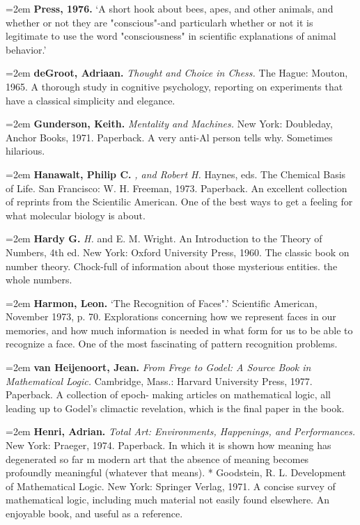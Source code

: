 \par\noindent\hangindent=2em {\bf Press, 1976.} `A short hook about bees, apes, and other animals, and whether or not they are "conscious"-and particularh whether or not it is legitimate to use the word "consciousness" in scientific explanations of animal behavior.' 

\par\noindent\hangindent=2em {\bf deGroot, Adriaan.} {\it Thought and Choice in Chess.} The Hague: Mouton, 1965. A thorough study in cognitive psychology, reporting on experiments that have a classical simplicity and elegance.

\par\noindent\hangindent=2em {\bf Gunderson, Keith.} {\it Mentality and Machines.} New York: Doubleday, Anchor Books, 1971. Paperback. A very anti-Al person tells why. Sometimes hilarious.

\par\noindent\hangindent=2em {\bf Hanawalt, Philip C.} {\it , and Robert H.} Haynes, eds. The Chemical Basis of Life. San Francisco: W. H. Freeman, 1973. Paperback. An excellent collection of reprints from the Scientilic American. One of the best ways to get a feeling for what molecular biology is about.

\par\noindent\hangindent=2em {\bf Hardy G.} {\it H.} and E. M. Wright. An Introduction to the Theory of Numbers, 4th ed. New York: Oxford University Press, 1960. The classic book on number theory. Chock-full of information about those mysterious entities. the whole numbers.

\par\noindent\hangindent=2em {\bf Harmon, Leon.} `The Recognition of Faces".' Scientific American, November 1973, p. 70. Explorations concerning how we represent faces in our memories, and how much information is needed in what form for us to be able to recognize a face. One of the most fascinating of pattern recognition problems.

\par\noindent\hangindent=2em {\bf van Heijenoort, Jean.} {\it From Frege to Godel: A Source Book in Mathematical Logic.} Cambridge, Mass.: Harvard University Press, 1977. Paperback. A collection of epoch- making articles on mathematical logic, all leading up to Godel's climactic revelation, which is the final paper in the book.

\par\noindent\hangindent=2em {\bf Henri, Adrian.} {\it Total Art: Environments, Happenings, and Performances.} New York: Praeger, 1974. Paperback. In which it is shown how meaning has degenerated so far m modern art that the absence of meaning becomes profoundly meaningful (whatever that means). * Goodstein, R. L. Development of Mathematical Logic. New York: Springer Verlag, 1971. A concise survey of mathematical logic, including much material not easily found elsewhere. An enjoyable book, and useful as a reference.

